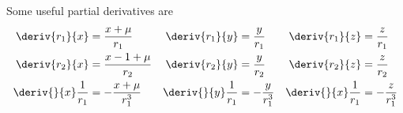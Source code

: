 Some useful partial derivatives are
\begin{align}\label{eq:dist_partials}
	\deriv{r_1}{x} &= \frac{x+\mu}{r_1} & \deriv{r_1}{y} &= \frac{y}{r_1} & \deriv{r_1}{z} &= \frac{z}{r_1}\\
	\deriv{r_2}{x} &= \frac{x -1 +\mu}{r_2} & \deriv{r_2}{y} &= \frac{y}{r_2} & \deriv{r_2}{z} &= \frac{z}{r_2}\\
	\deriv{}{x}\frac{1}{r_1} &= -\frac{x+\mu}{r_1^3} & \deriv{}{y}\frac{1}{r_1} &= -\frac{y}{r_1^3} & \deriv{}{x}\frac{1}{r_1} &= -\frac{z}{r_1^3}\\
\end{align}
